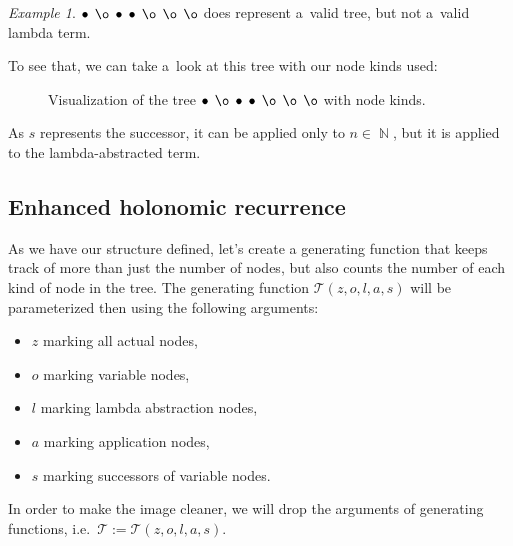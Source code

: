 \documentclass[final]{article}
\theoremstyle{definition}
\theoremstyle{definition}
\theoremstyle{remark}
\newtheorem{example}{Example}[subsection]
\newcommand{\gf}[1]{\ensuremath{\mathcal{#1}}}
\DeclareMathOperator{\N}{\mathbb{N}}
\DeclareMathOperator{\n}{\bullet}
\DeclareMathOperator{\no}{\o}
\begin{document}
\begin{example}
    \(\n\; \no\; \n\; \n\; \no\; \no\; \no\) does represent a~valid tree, but not a~valid lambda term.

To see that, we can take a~look at this tree with our node kinds used:

\begin{figure}[H]
    \centering
    
    \caption{Visualization of the tree \(\n\; \no\; \n\; \n\; \no\; \no\; \no\) with node kinds.}%
    \label{fig:lambda_tree_invalid}
\end{figure}

As \(s\) represents the successor, it can be applied only to \(n \in \N\), but it is applied to the lambda-abstracted term.
\end{example}

\subsection{Enhanced holonomic recurrence}%
\label{sub:enhanced_holonomic_reccurence}

As we have our structure defined, let's create a generating function that keeps track of more than just the number of nodes, but also counts the number of each kind of node in the tree. The generating function \(\gf{T}(z, o, l, a, s)\) will be parameterized then using the following arguments:
\begin{itemize}
    \item \(z\) marking all actual nodes,
    \item \(o\) marking variable nodes,
    \item \(l\) marking lambda abstraction nodes,
    \item \(a\) marking application nodes,
    \item \(s\) marking successors of variable nodes.
\end{itemize}

In order to make the image cleaner, we will drop the arguments of generating functions, i.e.~\(\gf{T} := \gf{T}(z, o, l, a, s)\).
\end{document}
